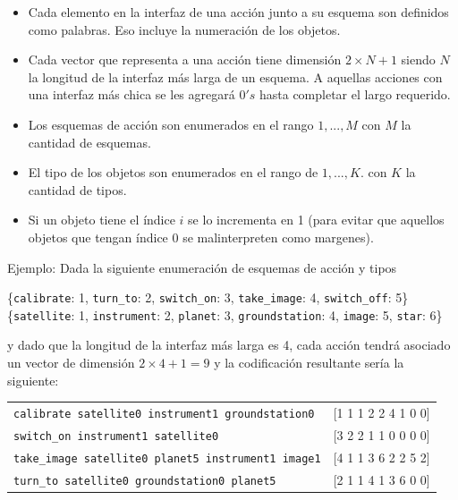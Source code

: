 \begin{itemize}
    \item Cada elemento en la interfaz de una acción junto a su esquema son
    definidos como palabras. Eso incluye la numeración de los objetos.
    \item Cada vector que representa a una acción tiene dimensión $2 \times N +
    1$ siendo $N$ la longitud de la interfaz más larga de un esquema. A aquellas
    acciones con una interfaz más chica se les agregará $0's$ hasta completar el
    largo requerido.
    \item Los esquemas de acción son enumerados en el rango $1, ..., M$ con $M$
    la cantidad de esquemas.
    \item El tipo de los objetos son enumerados en el rango de $1, ..., K$. con
    $K$ la cantidad de tipos.
    \item Si un objeto tiene el índice $i$ se lo incrementa en 1 (para evitar
    que aquellos objetos que tengan índice 0 se malinterpreten como margenes).
\end{itemize}

Ejemplo: Dada la siguiente enumeración de esquemas de acción y tipos

\begin{center}
    \{\verb|calibrate|: 1, \verb|turn_to|: 2, \verb|switch_on|: 3,
    \verb|take_image|: 4, \verb|switch_off|: 5\} \\
    \{\verb|satellite|: 1, \verb|instrument|: 2, \verb|planet|: 3,
    \verb|groundstation|: 4, \verb|image|: 5, \verb|star|: 6\}
\end{center}

\noindent y dado que  la longitud de la interfaz más larga es 4, cada
acción tendrá asociado un vector de dimensión $2 \times 4 + 1 = 9$ y la
codificación resultante sería la siguiente:

\begin{table}[h!]
    \centering
    \begin{tabular}{l|c}
        \verb|calibrate satellite0 instrument1 groundstation0| & {} [1 1 1 2 2
        4 1 0 0] \\
        \verb|switch_on instrument1 satellite0| & {} [3 2 2 1 1 0 0 0 0] \\
        \verb|take_image satellite0 planet5 instrument1 image1| & {} [4 1 1 3 6
        2 2 5 2] \\
        \verb|turn_to satellite0 groundstation0 planet5| & {} [2 1 1 4 1 3 6 0
        0] \\
    \end{tabular}
\end{table}

